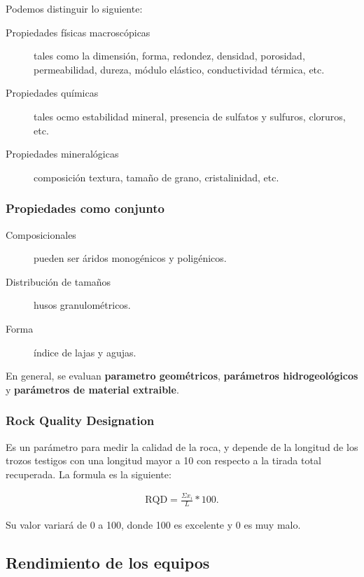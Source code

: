 \documentclass[../main.tex]{subfiles}
\begin{document}
Podemos distinguir lo siguiente:

\begin{description}
  \item[Propiedades físicas macroscópicas] tales como la dimensión, forma, 
    redondez, densidad, porosidad, permeabilidad, dureza, módulo elástico, 
    conductividad térmica, etc.
  \item[Propiedades químicas] tales ocmo estabilidad mineral, presencia de
    sulfatos y sulfuros, cloruros, etc.
  \item[Propiedades mineralógicas] composición textura, tamaño de grano, 
    cristalinidad, etc.
\end{description}

\subsubsection{Propiedades como conjunto}

\begin{description}
  \item[Composicionales] pueden ser áridos monogénicos y poligénicos. 
  \item[Distribución de tamaños] husos granulométricos.
  \item[Forma] índice de lajas y agujas.
\end{description}

En general, se evaluan \textbf{parametro geométricos}, \textbf{parámetros hidrogeológicos} 
y \textbf{parámetros de material extraible}.

\subsubsection{Rock Quality Designation}

Es un parámetro para medir la calidad de la roca, y depende de la longitud de 
los trozos testigos con una longitud mayor a 10 con respecto a la tirada total
recuperada. La formula es la siguiente:

\begin{align*}
  \text{RQD} = \frac{\Sigma x_{i}}{L}*100
.\end{align*}

Su valor variará de 0 a 100, donde 100 es excelente y 0 es muy malo.


\subsection{Rendimiento de los equipos}
\end{document}
